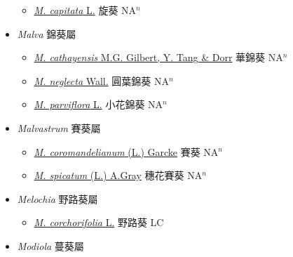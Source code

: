 \begin{itemize}
  \begin{itemize}
        \item[] \href{http://www.theplantlist.org/tpl1.1/search?q=Malachra+capitata}{\textit{M. capitata} L.}   旋葵 NA$^n$
  \end{itemize}
 \item[] \textit{Malva} 錦葵屬
                    
  \begin{itemize}
        \item[] \href{http://www.theplantlist.org/tpl1.1/search?q=Malva+cathayensis}{\textit{M. cathayensis} M.G. Gilbert, Y. Tang \& Dorr}     華錦葵 NA$^n$
        \item[] \href{http://www.theplantlist.org/tpl1.1/search?q=Malva+neglecta}{\textit{M. neglecta} Wall.}   圓葉錦葵 NA$^n$
        \item[] \href{http://www.theplantlist.org/tpl1.1/search?q=Malva+parviflora}{\textit{M. parviflora} L.}   小花錦葵 NA$^n$
  \end{itemize}
 \item[] \textit{Malvastrum} 賽葵屬
                    
  \begin{itemize}
        \item[] \href{http://www.theplantlist.org/tpl1.1/search?q=Malvastrum+coromandelianum}{\textit{M. coromandelianum} (L.) Garcke}   賽葵 NA$^n$
        \item[] \href{http://www.theplantlist.org/tpl1.1/search?q=Malvastrum+spicatum}{\textit{M. spicatum} (L.) A.Gray}   穗花賽葵 NA$^n$
  \end{itemize}
 \item[] \textit{Melochia} 野路葵屬
                    
  \begin{itemize}
        \item[] \href{http://www.theplantlist.org/tpl1.1/search?q=Melochia+corchorifolia}{\textit{M. corchorifolia} L.}   野路葵 LC
  \end{itemize}
 \item[] \textit{Modiola} 蔓葵屬
                    

\end{itemize}
